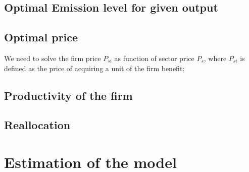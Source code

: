 \documentclass[11pt]{article}
\begin{document}
\subsection{Optimal Emission level for given output}\label{Ap:optimal emission level}

\subsection{Optimal price}\label{Ap:optimal price}
We need to solve the firm price $P_{si}$ as function of sector price $P_s$, where $P_{si}$ is defined as the price of acquiring a unit of the firm benefit:
    
\subsection{Productivity of the firm}\label{Ap:productivity}




\subsection{Reallocation} \label{Ap:reallocation}




\section{Estimation of the model}
\label{Ap:estimation}


\clearpage


\begin{doublespacing}   %


\end{doublespacing}

\clearpage

\renewcommand{\enotesize}{\normalsize}
\begin{doublespacing}
  \theendnotes
\end{doublespacing}

\clearpage
\end{document}
